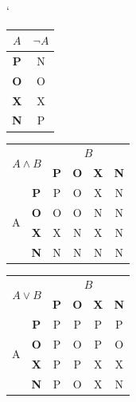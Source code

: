 \documentclass[a4paper, 11pt]{article}
\begin{document}
\begin{table}[ht]
\begin{center}
\catcode `
	\begin{tabular}{|c|c|}
			\hline
			$A$ & $\neg A$ \\
			\hline
			\textbf{P} & N \\
			\hline
			\textbf{O} & O \\
			\hline
			\textbf{X} & X \\
			\hline
			\textbf{N} & P \\
			\hline
	\end{tabular}
	\begin{tabular}{|c|c|c|c|c|c|}
		\hline

			\multicolumn{2}{|c|}{\multirow{2}{*}{$A \wedge B$}} & \multicolumn{4}{|c|}{$B$} \\
			\cline{3-6}

			\multicolumn{2}{|c|}{} & \textbf{P} & \textbf{O} & \textbf{X} & \textbf{N} \\ 
			\hline
			\multirow{4}{*}{A} & \textbf{P} & P & O & X & N \\ 
			\cline{2-6}
			& \textbf{O} & O & O & N & N \\
			\cline{2-6}
			 & \textbf{X} & X & N & X & N \\
			\cline{2-6}
			& \textbf{N} & N & N & N & N \\


			\hline

		\hline
	\end{tabular}
	\begin{tabular}{|c|c|c|c|c|c|}
		\hline

			\multicolumn{2}{|c|}{\multirow{2}{*}{$A \vee B$}} & \multicolumn{4}{|c|}{$B$} \\
			\cline{3-6}

			\multicolumn{2}{|c|}{} & \textbf{P} & \textbf{O} & \textbf{X} & \textbf{N} \\ 
			\hline
			\multirow{4}{*}{A} & \textbf{P} & P & P & P & P \\ 
			\cline{2-6}
			& \textbf{O} & P & O & P & O \\
			\cline{2-6}
			 & \textbf{X} & P & P & X & X \\
			\cline{2-6}
			& \textbf{N} & P & O & X & N \\


			\hline

		\hline
	\end{tabular}
	\begin{tabular}{|c|c|c|c|c|c|}
		\hline


\end{tabular}
\end{center}
\end{table}
\end{document}
